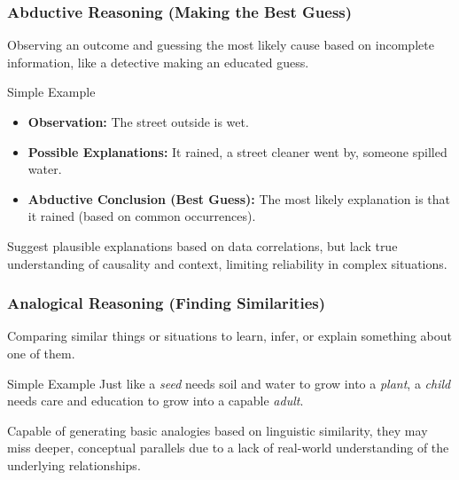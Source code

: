 \begin{frame}
\frametitle{Abductive Reasoning (Making the Best Guess)}

Observing an outcome and guessing the most likely cause based on incomplete information, like a detective making an educated guess.

\bigskip

\begin{block}{Simple Example}
  \begin{itemize}
    \item \textbf{Observation:} The street outside is wet.
    \item \textbf{Possible Explanations:} It rained, a street cleaner went by, someone spilled water.
    \item \textbf{Abductive Conclusion (Best Guess):} The most likely explanation is that it rained (based on common occurrences).
  \end{itemize}
\end{block}

\bigskip

 Suggest plausible explanations based on data correlations, but lack true understanding of causality and context, limiting reliability in complex situations.
\end{frame}

\begin{frame}
\frametitle{Analogical Reasoning (Finding Similarities)}

Comparing similar things or situations to learn, infer, or explain something about one of them.

\bigskip

\begin{block}{Simple Example}
  Just like a \textit{seed} needs soil and water to grow into a \textit{plant}, a \textit{child} needs care and education to grow into a capable \textit{adult}.
\end{block}

\bigskip

Capable of generating basic analogies based on linguistic similarity, they may miss deeper, conceptual parallels due to a lack of real-world understanding of the underlying relationships.
\end{frame}
